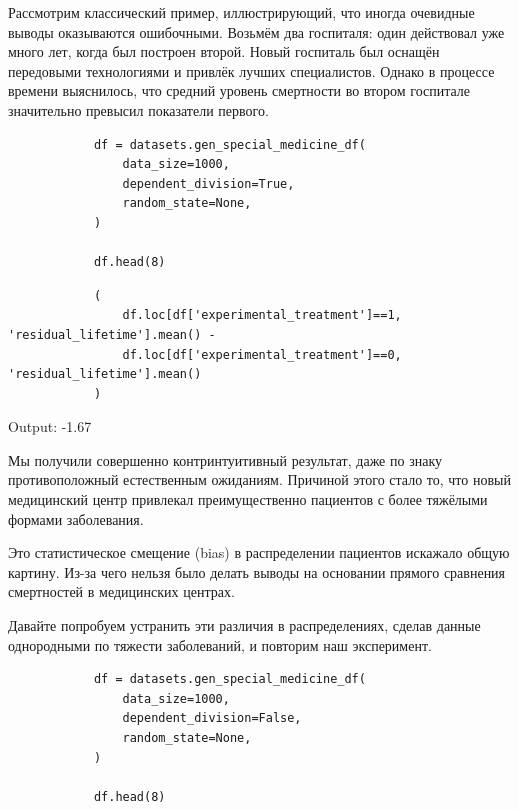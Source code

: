         Рассмотрим классический пример, иллюстрирующий, что иногда очевидные выводы оказываются ошибочными.
        Возьмём два госпиталя: один действовал уже много лет, когда был построен второй.
        Новый госпиталь был оснащён передовыми технологиями и привлёк лучших специалистов.
        Однако в процессе времени выяснилось, что средний уровень смертности во втором госпитале значительно превысил показатели первого.


        \begin{verbatim}
            df = datasets.gen_special_medicine_df(
                data_size=1000,
                dependent_division=True,
                random_state=None,
            )

            df.head(8)
        \end{verbatim}

        

        \begin{verbatim}
            (
                df.loc[df['experimental_treatment']==1, 'residual_lifetime'].mean() -
                df.loc[df['experimental_treatment']==0, 'residual_lifetime'].mean()
            )
        \end{verbatim}

        Output: -1.67

        Мы получили совершенно контринтуитивный результат, даже по знаку противоположный естественным ожиданиям.
        Причиной этого стало то, что новый медицинский центр привлекал преимущественно пациентов с более тяжёлыми формами заболевания.

        Это статистическое смещение (bias) в распределении пациентов искажало общую картину.
        Из-за чего нельзя было делать выводы на основании прямого сравнения смертностей в медицинских центрах.

        Давайте попробуем устранить эти различия в распределениях, сделав данные однородными по тяжести заболеваний, и повторим наш эксперимент.


        \begin{verbatim}
            df = datasets.gen_special_medicine_df(
                data_size=1000,
                dependent_division=False,
                random_state=None,
            )

            df.head(8)
        \end{verbatim}

